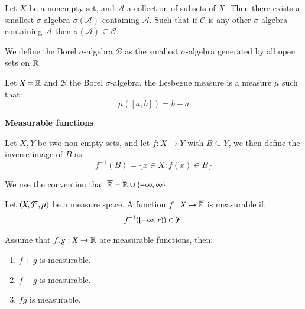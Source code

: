 \begin{proposition}
Let $X$ be a nonempty set, and $\mathcal{A}$ a collection of subsets of $X$. Then there exists a smallest $\sigma$-algebra $\sigma(\mathcal{A})$ containing $\mathcal{A}$. Such that if $\mathcal{C}$ is any other $\sigma$-algebra containing $\mathcal{A}$ then $\sigma(\mathcal{A}) \subseteq \mathcal{C}$. 
\end{proposition}

\begin{definition}
We define the Borel $\sigma$-algebra $\mathcal{B}$ as the smallest $\sigma$-algebra generated by all open sets on $\mathbb{R}$.
\end{definition}

\begin{example}
Let $X = \mathbb{R}$ and $\mathcal{B}$ the Borel $\sigma$-algebra, the Lesbegue measure is a measure $\mu$ such that: 
\[
\mu([a,b]) = b-a
\]
\end{example}



\centerline{\textbf{Measurable functions}}
\begin{definition}
Let $X,Y$ be two non-empty sets, and let $f:X\to Y$ with $B\subseteq Y$, we then define the inverse image of $B$ as: 
\[f^{-1}(B) = \{x\in X: f(x)\in B\}
\]
\end{definition} 

We use the convention that $\overline{\mathbb{R}} = \mathbb{R}\cup \{-\infty, \infty\}$

\begin{definition}
Let $(X, \mathcal{F}, \mu)$ be a measure space. A function $f:X \to \overline{\mathbb{R}}$ is measurable if:
\begin{align*}
f^{-1}([-\infty, r)) \in \mathcal{F}   
\end{align*}
\end{definition}

\begin{proposition}
Assume that $f,g:X\to \mathbb{R}$ are measurable functions, then: 
\begin{enumerate}[label = (\roman*), leftmargin=*]
    \item $f+g$ is measurable.
    \item $f-g$ is measurable. 
    \item $fg$  is measurable.
\end{enumerate}
\end{proposition}


